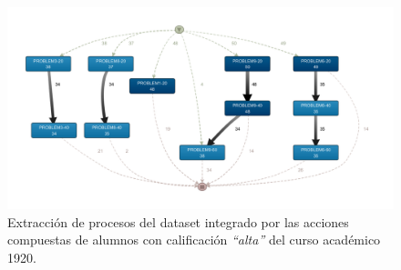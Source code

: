 \begin{figure}[H]
    \centering
    \includegraphics[width=1.25\textwidth]{imagenes/Year1920HighGrades.png}
    \caption{Extracción de procesos del dataset integrado por las acciones compuestas de alumnos con calificación \emph{``alta''} del curso académico 1920.}
    \label{fig:year1920BestGrades}
\end{figure}